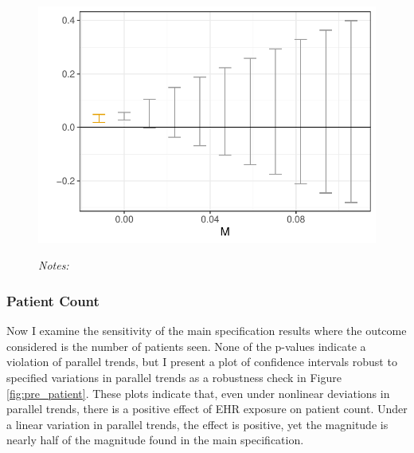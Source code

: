 \documentclass[12pt]{article}
\begin{document}
\begin{figure}[ht]
    \centering
    \captionsetup{width=.5\linewidth}
    \caption{}
    \includegraphics[scale=.5]{Objects/zip_pretrends_plot.pdf}
    \label{fig:pre_zip}
    \vspace{2mm}
    \caption*{\footnotesize{\textit{Notes:}}}
\end{figure}

\subsubsection{Patient Count}

Now I examine the sensitivity of the main specification results where the outcome considered is the number of patients seen. None of the p-values indicate a violation of parallel trends, but I present a plot of confidence intervals robust to specified variations in parallel trends as a robustness check in Figure \ref{fig:pre_patient}. These plots indicate that, even under nonlinear deviations in parallel trends, there is a positive effect of EHR exposure on patient count. Under a linear variation in parallel trends, the effect is positive, yet the magnitude is nearly half of the magnitude found in the main specification. 
\end{document}
